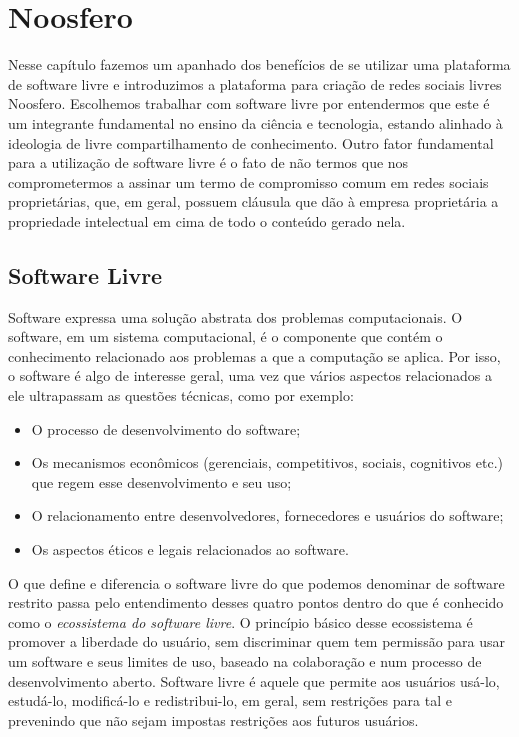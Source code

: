 \chapter{Noosfero}
\label{cap:noosfero}

Nesse capítulo fazemos um apanhado dos benefícios de se utilizar uma
plataforma de software livre e introduzimos a plataforma para criação de
redes sociais livres Noosfero. Escolhemos trabalhar com software livre por
entendermos que este é um integrante fundamental no ensino da ciência e 
tecnologia, estando alinhado à ideologia de livre compartilhamento de
conhecimento. Outro fator fundamental para a utilização de software livre é o
fato de não termos que nos comprometermos a assinar um termo de compromisso
comum em redes sociais proprietárias, que, em geral, possuem cláusula que dão à
empresa proprietária a propriedade intelectual em cima de todo o conteúdo
gerado nela.


\section{Software Livre}

Software expressa uma solução abstrata dos problemas computacionais.
%
O software, em um sistema computacional, é o componente que contém o
conhecimento relacionado aos problemas a que a computação se aplica.
%
Por isso, o software é algo de interesse geral, uma vez que vários aspectos
relacionados a ele ultrapassam as questões técnicas, como por exemplo:
\begin{itemize}
\item O processo de desenvolvimento do software; 
\item Os mecanismos econômicos (gerenciais, competitivos, sociais, cognitivos etc.)
que regem esse desenvolvimento e seu uso;
\item O relacionamento entre desenvolvedores, fornecedores e usuários do
        software;
\item Os aspectos éticos e legais relacionados ao software.
\end{itemize}

O que define e diferencia o software livre do que podemos denominar de
software restrito passa pelo entendimento desses quatro pontos dentro do que é
conhecido como o \emph{ecossistema do software livre}.
%
O princípio básico desse ecossistema é promover a liberdade do usuário,
sem discriminar quem tem permissão para usar um software e seus limites de uso,
baseado na colaboração e num processo de desenvolvimento aberto.
%
Software livre é aquele que permite aos usuários usá-lo, estudá-lo, modificá-lo e
redistribui-lo, em geral, sem restrições para tal e prevenindo que não sejam
impostas restrições aos futuros usuários.
%

